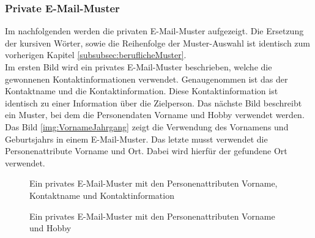 		\subsubsection{Private E-Mail-Muster}
			Im nachfolgenden werden die privaten E-Mail-Muster aufgezeigt. Die Ersetzung der kursiven Wörter, sowie die Reihenfolge der Muster-Auswahl ist identisch zum vorherigen Kapitel \ref{subsubsec:beruflicheMuster}.\\
			Im ersten Bild wird ein privates E-Mail-Muster beschrieben, welche die gewonnenen Kontaktinformationen verwendet. Genaugenommen ist das der Kontaktname und die Kontaktinformation. Diese Kontaktinformation ist identisch zu einer Information über die Zielperson. Das nächste Bild beschreibt ein Muster, bei dem die Personendaten Vorname und Hobby verwendet werden. Das Bild \ref{img:VornameJahrgang} zeigt die Verwendung des Vornamens und Geburtsjahrs in einem E-Mail-Muster. Das letzte musst verwendet die Personenattribute Vorname und Ort. Dabei wird hierfür der gefundene Ort verwendet.
			\begin{figure}[h!]
			\caption{Ein privates E-Mail-Muster mit den Personenattributen Vorname, Kontaktname und Kontaktinformation}
			\end{figure}
			
			\begin{figure}[h!]
				\caption{Ein privates E-Mail-Muster mit den Personenattributen Vorname und Hobby}
			\end{figure}
		
